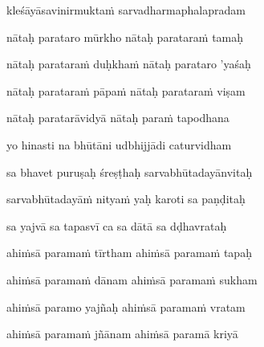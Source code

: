 kleśāyāsavinirmuktaṁ sarvadharmaphalapradam \veg\dontdisplaylinenum

nātaḥ parataro mūrkho nātaḥ parataraṁ tamaḥ\thinspace{\dandab} \dontdisplaylinenum
{}

nātaḥ parataraṁ duḥkhaṁ nātaḥ parataro 'yaśaḥ \veg\dontdisplaylinenum

nātaḥ parataraṁ pāpaṁ nātaḥ parataraṁ viṣam\thinspace{\dandab} \dontdisplaylinenum

nātaḥ paratarāvidyā nātaḥ paraṁ tapodhana \veg\dontdisplaylinenum
{}

yo hinasti na bhūtāni udbhijjādi caturvidham\thinspace{\dandab} \dontdisplaylinenum
{}

sa bhavet puruṣaḥ śreṣṭhaḥ sarvabhūtadayānvitaḥ \veg\dontdisplaylinenum
{}

sarvabhūtadayāṁ nityaṁ yaḥ karoti sa paṇḍitaḥ\thinspace{\dandab} \dontdisplaylinenum
{}

sa yajvā sa tapasvī ca sa dātā sa dḍhavrataḥ \veg\dontdisplaylinenum
{}

ahiṁsā paramaṁ tīrtham ahiṁsā paramaṁ tapaḥ\thinspace{\dandab} \dontdisplaylinenum
{}

ahiṁsā paramaṁ dānam ahiṁsā paramaṁ sukham \veg\dontdisplaylinenum

ahiṁsā paramo yajñaḥ ahiṁsā paramaṁ vratam\thinspace{\dandab} \dontdisplaylinenum
{}

ahiṁsā paramaṁ jñānam ahiṁsā paramā kriyā \veg\dontdisplaylinenum
{}

